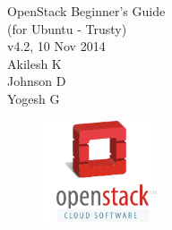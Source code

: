 \documentclass[10pt]{book}
\let\origdoublepage\cleardoublepage
\newcommand{\clearemptydoublepage}{%
  \clearpage
  {\pagestyle{empty}\origdoublepage}%
}
\begin{document}
\frontmatter

\thispagestyle{empty}



\clearemptydoublepage


\pagebreak
\thispagestyle{empty}
\begin{center}
{\huge OpenStack Beginner's Guide }
\vspace{0.2cm}
{\Large \\(for Ubuntu - Trusty)}
\vspace{0.2cm}
{\large \\v4.2, 10 Nov 2014}
\vspace{2in}
{\large
\\
Akilesh K\\
Johnson D\\
Yogesh G\\
}
\end{center}
\vspace{0.1in}
\begin{figure}[h!]
	\begin{center}
		\href{http://www.openstack.org/}{\includegraphics[width=0.3\textwidth]{../images/openstacklogo}}
		\label{openstack logo}
	\end{center}
\end{figure}
\end{document}
